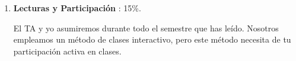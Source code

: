 \documentclass[letterpaper]{article}
\begin{document}
\begin{enumerate}

	\item {\bf Lecturas y Participaci\'on }: 15\%.
	
    El TA y yo asumiremos durante todo el semestre que has le\'ido. Nosotros empleamos un m\'etodo de clases interactivo, pero este m\'etodo necesita de tu participaci\'on activa en clases.
    \\
    \\  



\end{enumerate}
\end{document}
